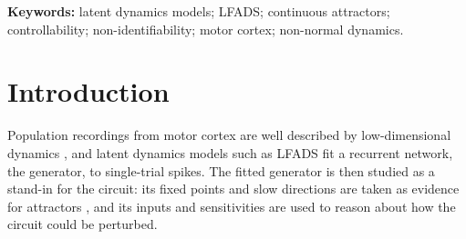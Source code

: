 \documentclass[11pt,a4paper]{article}
\begin{document}
\begin{abstract}
For the original result this means that the 0.1\% most likely reflects the fitted model, in particular its gated generator, rather than the cortex. We propose inexpensive checks (swap and shift tests, plan-before-cue decoding, held-out trials, and inferred channels compared with random ones) that can be run on any fitted model.
\end{abstract}

\vspace{0.5em}
{\raggedright\noindent\textbf{Keywords:} latent dynamics models; LFADS; continuous attractors; controllability; non-identifiability; motor cortex; non-normal dynamics.\par}

\newpage
\tableofcontents
\newpage

\section{Introduction}\label{sec:intro}

Population recordings from motor cortex are well described by low-dimensional dynamics \citep{churchland2012,vyas2020}, and latent dynamics models such as LFADS \citep{sussillo2016,pandarinath2018} fit a recurrent network, the generator, to single-trial spikes. The fitted generator is then studied as a stand-in for the circuit: its fixed points and slow directions are taken as evidence for attractors \citep{sussillo2013,khona2022}, and its inputs and sensitivities are used to reason about how the circuit could be perturbed.
\end{document}
